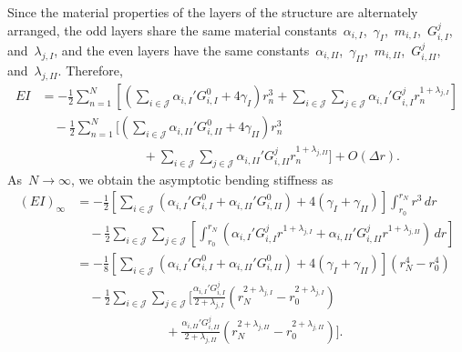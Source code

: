 \documentclass[preprint,10pt,times]{elsarticle}
\numberwithin{equation}{section}
\renewcommand{\>}{$\Rightarrow$}
\begin{document}
Since the material properties of the layers of the structure are alternately arranged, the odd layers share the same material constants~$\alpha_{i,I}$,~$\gamma_{I}$,~$m_{i,I}$,~$G^j_{i,I}$, and~$\lambda_{j,I}$, and the even layers have the same constants~$\alpha_{i,II}$,~$\gamma_{II}$,~$m_{i,II}$,~$G^j_{i,II}$, and~$\lambda_{j,II}$. Therefore,
\begin{equation}
\begin{aligned}
	EI & =  - \frac{1}{2} \sum_{n=1}^{N} \left[ \left( \sum_{i \in \mathcal{J}} \alpha_{i,I}' G^0_{i,I} + 4\gamma_I \right) r_n^3+ \sum_{i \in \mathcal{J}} \sum_{j \in \mathcal{J}} \alpha_{i,I}' G^j_{i,I} r^{1 + \lambda_{j,I}}_n \right] \\
	 & \quad - \frac{1}{2} \sum_{n=1}^{N} \biggr[ \left( \sum_{i \in \mathcal{J}} \alpha_{i,II}' G^0_{i,II} + 4\gamma_{II} \right) r_n^3 \\
	  & \qquad \qquad \qquad \qquad + \sum_{i \in \mathcal{J}} \sum_{j \in \mathcal{J}} \alpha_{i,II}' G^j_{i,II} r^{1 + \lambda_{j,II}}_n \biggr] + O(\Delta r).
\end{aligned}
\end{equation}
As~$N \to \infty$, we obtain the asymptotic bending stiffness as
\begin{equation}
\begin{aligned}
	(EI)_{\infty} & =  - \frac{1}{2} \left[ \sum_{i \in \mathcal{J}} \left( \alpha_{i,I}' G^0_{i,I} + \alpha_{i,II}' G^0_{i,II} \right) + 4\left( \gamma_I +\gamma_{II} \right) \right] \int_{r_0}^{r_N} r^3 \, dr \\
	& \quad - \frac{1}{2} \sum_{i \in \mathcal{J}} \sum_{j \in \mathcal{J}} \left[ \int_{r_0}^{r_N} \left( \alpha_{i,I}' G^j_{i,I} r^{1 + \lambda_{j,I}} + \alpha_{i,II}' G^j_{i,II}  r^{1 + \lambda_{j,II}} \right) \, dr \right] \\
	& = - \frac{1}{8} \left[ \sum_{i \in \mathcal{J}} \left( \alpha_{i,I}' G^0_{i,I} + \alpha_{i,II}' G^0_{i,II} \right) + 4\left( \gamma_I +\gamma_{II} \right) \right] \left( r_N^4 - r_0^4 \right) \\
	& \quad - \frac{1}{2} \sum_{i \in \mathcal{J}} \sum_{j \in \mathcal{J}} \biggr[ \frac{\alpha_{i,I}' G^j_{i,I}}{2 + \lambda_{j,I} } \left( r_N^{2 + \lambda_{j,I}} - r_0^{2 + \lambda_{j,I}} \right) \\
	& \qquad \qquad \qquad \quad + \frac{\alpha_{i,II}' G^j_{i,II}}{2 + \lambda_{j,II}} \left( r_N^{2 + \lambda_{j,II}} - r_0^{2 + \lambda_{j,II}} \right) \biggr] .
\end{aligned}
\label{eq:two_mat_no_slip_EI}
\end{equation}
\end{document}
